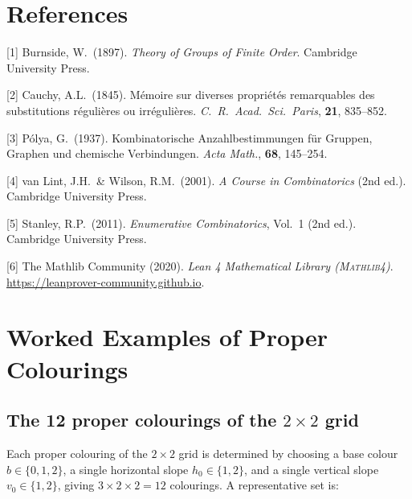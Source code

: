 \documentclass{article}
\begin{document}
\section*{References}

{\small

[1] Burnside, W.\ (1897).
\textit{Theory of Groups of Finite Order}.
Cambridge University Press.

[2] Cauchy, A.L.\ (1845).
M\'{e}moire sur diverses propri\'{e}t\'{e}s remarquables
des substitutions r\'{e}guli\`{e}res ou irr\'{e}guli\`{e}res.
\textit{C.~R.\ Acad.\ Sci.\ Paris}, \textbf{21}, 835--852.

[3] P\'{o}lya, G.\ (1937).
Kombinatorische Anzahlbestimmungen f\"{u}r Gruppen, Graphen
und chemische Verbindungen.
\textit{Acta Math.}, \textbf{68}, 145--254.

[4] van Lint, J.H.\ \& Wilson, R.M.\ (2001).
\textit{A Course in Combinatorics} (2nd ed.).
Cambridge University Press.

[5] Stanley, R.P.\ (2011).
\textit{Enumerative Combinatorics}, Vol.~1 (2nd ed.).
Cambridge University Press.

[6] The Mathlib Community (2020).
\textit{Lean 4 Mathematical Library (\textsc{Mathlib4})}.
\url{https://leanprover-community.github.io}.

}

\appendix
\section{Worked Examples of Proper Colourings}
\label{app:examples}

\subsection{The 12 proper colourings of the $2\times 2$ grid}

Each proper colouring of the $2\times 2$ grid is determined
by choosing a base colour $b\in\{0,1,2\}$, a single
horizontal slope $h_0\in\{1,2\}$, and a single vertical slope
$v_0\in\{1,2\}$, giving $3\times 2\times 2 = 12$ colourings.
A representative set is:
\end{document}
